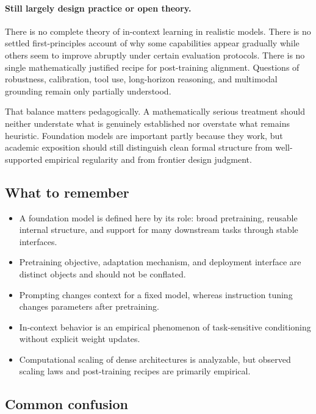 \paragraph{Still largely design practice or open theory.}
There is no complete theory of in-context learning in realistic models.
There is no settled first-principles account of why some capabilities appear gradually while others seem to improve abruptly under certain evaluation protocols.
There is no single mathematically justified recipe for post-training alignment.
Questions of robustness, calibration, tool use, long-horizon reasoning, and multimodal grounding remain only partially understood.

That balance matters pedagogically.
A mathematically serious treatment should neither understate what is genuinely established nor overstate what remains heuristic.
Foundation models are important partly because they work, but academic exposition should still distinguish clean formal structure from well-supported empirical regularity and from frontier design judgment.

\subsection*{What to remember}

\begin{itemize}
    \item A foundation model is defined here by its role: broad pretraining, reusable internal structure, and support for many downstream tasks through stable interfaces.
    \item Pretraining objective, adaptation mechanism, and deployment interface are distinct objects and should not be conflated.
    \item Prompting changes context for a fixed model, whereas instruction tuning changes parameters after pretraining.
    \item In-context behavior is an empirical phenomenon of task-sensitive conditioning without explicit weight updates.
    \item Computational scaling of dense architectures is analyzable, but observed scaling laws and post-training recipes are primarily empirical.
\end{itemize}

\subsection*{Common confusion}

